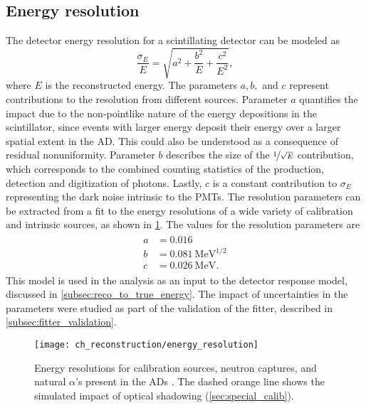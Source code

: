 \subsection{Energy resolution}
\label{subsec:resolution}

The detector energy resolution for a scintillating detector can be modeled as
\cite{energy_resolution}
\begin{equation}
    \frac{\sigma_E}{E} = \sqrt{a^2 + \frac{b^2}{E} + \frac{c^2}{E^2}},
\end{equation}
where $E$ is the reconstructed energy.
The parameters $a,b,$ and $c$ represent contributions to the resolution
from different sources.
Parameter $a$ quantifies the impact due to the non-pointlike nature
of the energy depositions in the scintillator,
since events with larger energy deposit their energy over a larger spatial extent
in the AD.
This could also be understood as a consequence of residual nonuniformity.
Parameter $b$ describes the size of the $\nicefrac{1}{\sqrt{E}}$ contribution,
which corresponds to the combined counting statistics of
the production, detection and digitization of photons.
Lastly, $c$ is a constant contribution to $\sigma_E$
representing the dark noise intrinsic to the PMTs.
The resolution parameters can be extracted from a fit
to the energy resolutions of a wide variety of calibration and intrinsic sources,
as shown in \cref{fig:resolution}.
The values for the resolution parameters are \cite{ngd2016}
\begin{align}\label{eq:resolution_params}
    \begin{split}
        a &= 0.016 \\
        b &= \SI{0.081}{\MeV\tothe{1/2}} \\
        c &= \SI{0.026}{\MeV}.
    \end{split}
\end{align}
This model is used in the \thetaot{} analysis
as an input to the detector response model,
discussed in \cref{subsec:reco_to_true_energy}.
The impact of uncertainties in the parameters
were studied as part of the validation of the fitter,
described in \cref{subsec:fitter_validation}.

\begin{figure}
    \centering
    \texttt{[image: ch\_reconstruction/energy\_resolution]}
    \caption[Energy resolution]{Energy resolutions for calibration sources, neutron captures,
        and natural $\alpha$'s present in the ADs \cite{ngd2016}.
        The dashed orange line shows the simulated impact
        of optical shadowing (\cref{sec:special_calib}).
    }
    \label{fig:resolution}
\end{figure}


